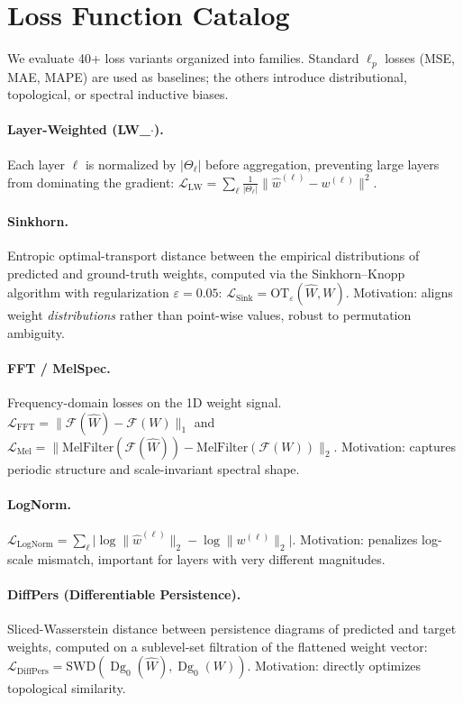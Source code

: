 \documentclass{article}
\newcommand{\SWD}{\mathrm{SWD}}
\newcommand{\Dg}{\operatorname{Dg}}
\begin{document}
\section{Loss Function Catalog}
\label{app:losses}

We evaluate 40+ loss variants organized into families.  Standard
$\ell_p$ losses (MSE, MAE, MAPE) are used as baselines; the others
introduce distributional, topological, or spectral inductive biases.

\paragraph{Layer-Weighted (LW\_$\cdot$).}
Each layer $\ell$ is normalized by $|\Theta_\ell|$ before aggregation,
preventing large layers from dominating the gradient:
$\mathcal{L}_{\mathrm{LW}} = \sum_\ell \frac{1}{|\Theta_\ell|}
\|\hat w^{(\ell)} - w^{(\ell)}\|^2$.

\paragraph{Sinkhorn.}
Entropic optimal-transport distance between the empirical distributions
of predicted and ground-truth weights, computed via the Sinkhorn--Knopp
algorithm with regularization $\varepsilon=0.05$:
$\mathcal{L}_{\mathrm{Sink}} = \mathrm{OT}_\varepsilon(\hat W, W)$.
Motivation: aligns weight \emph{distributions} rather than point-wise
values, robust to permutation ambiguity.

\paragraph{FFT / MelSpec.}
Frequency-domain losses on the 1D weight signal.
$\mathcal{L}_{\mathrm{FFT}} = \|\mathcal{F}(\hat W) - \mathcal{F}(W)\|_1$
and $\mathcal{L}_{\mathrm{Mel}} = \|\mathrm{MelFilter}(\mathcal{F}(\hat W))
- \mathrm{MelFilter}(\mathcal{F}(W))\|_2$.
Motivation: captures periodic structure and scale-invariant spectral shape.

\paragraph{LogNorm.}
$\mathcal{L}_{\mathrm{LogNorm}} = \sum_\ell
\bigl|\log\|\hat w^{(\ell)}\|_2 - \log\|w^{(\ell)}\|_2\bigr|$.
Motivation: penalizes log-scale mismatch, important for layers with
very different magnitudes.

\paragraph{DiffPers (Differentiable Persistence).}
Sliced-Wasserstein distance between persistence diagrams of predicted
and target weights, computed on a sublevel-set filtration of the
flattened weight vector:
$\mathcal{L}_{\mathrm{DiffPers}} = \SWD(\Dg_0(\hat W), \Dg_0(W))$.
Motivation: directly optimizes topological similarity.
\end{document}
